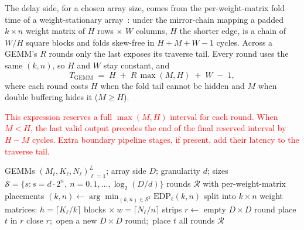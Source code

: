 The delay side, for a chosen array size, comes from the per-weight-matrix
fold time of a weight-stationary array~\cite{samajdar2020systematic}: under
the mirror-chain mapping a padded
$k{\times}n$ weight matrix of $H$ rows $\times$ $W$ columns, $H$ the
shorter edge, is a chain of $W/H$ square blocks and folds skew-free
in $H{+}M{+}W{-}1$ cycles. Across a GEMM's $R$ rounds only the
last exposes its traverse tail. Every round uses the same $(k,n)$, so
$H$ and $W$ stay constant, and
\[
  T_{\mathrm{GEMM}}
    \;=\; H \;+\; R\,\max(M, H) \;+\; W \;-\; 1 ,
\]
where each round costs $H$ when the fold tail cannot be hidden and $M$
when double buffering hides it ($M{\ge}H$).

\begingroup
\textcolor{red}{This expression reserves a full $\max(M,H)$ interval for each round.
When $M<H$, the last valid output precedes the end of the final
reserved interval by $H-M$ cycles. Extra boundary pipeline stages,
if present, add their latency to the traverse tail.}
\par
\endgroup

\begingroup
\makeatletter
\let\TesseraSavedFloatMakebox\float@makebox
\def\float@makebox#1{\color@vbox\normalcolor\TesseraSavedFloatMakebox{#1}\color@endbox}
\makeatother
\begin{algorithm}[t]
\footnotesize
\caption{Per-GEMM EDP-optimal mapping.}
\label{alg:tessera-sched}
\begin{algorithmic}[1]
\REQUIRE GEMMs $(M_\ell,K_\ell,N_\ell)_{\ell=1}^{L}$; array side $D$;
granularity $d$; sizes $\mathcal{S}{=}\{s : s{=}d\cdot 2^n,\ n{=}0,1,\ldots,\log_2(D/d)\}$
\ENSURE rounds $\mathcal{R}$ with per-weight-matrix placements
  \STATE $(k,n) \gets \arg\min_{(k,n)\in\mathcal{S}^2}\mathrm{EDP}_\ell(k,n)$
  \STATE split into $k{\times}n$ weight matrices:
         $h{=}\lceil K_\ell/k\rceil$ blocks $\times\ w{=}\lceil N_\ell/n\rceil$ strips
\ENDFOR
\STATE $r \gets$ empty $D{\times}D$ round
    \STATE place $t$ in $r$
  \ELSE
    \STATE close $r$;\ open a new $D{\times}D$ round;\ place $t$
  \ENDIF
\ENDFOR
\RETURN all rounds $\mathcal{R}$
\end{algorithmic}
\end{algorithm}
\endgroup


